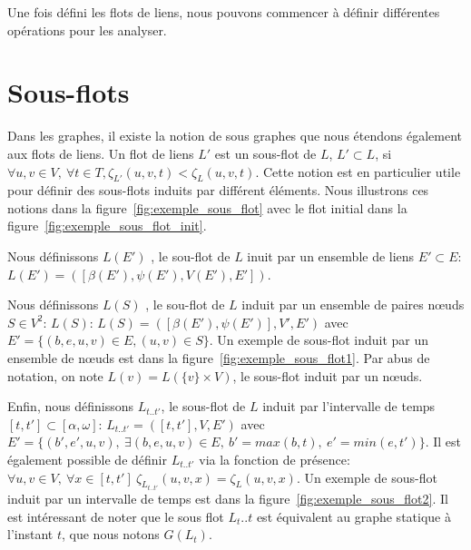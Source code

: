 Une fois défini les flots de liens, nous pouvons commencer à définir différentes opérations pour les analyser.


\section{Sous-flots}
Dans les graphes, il existe la notion de sous graphes que nous étendons également aux flots de liens.
Un flot de liens $L'$ est un sous-flot de $L$, $L' \subset L$, si  $\forall u,v \in V,\ \forall t\in T, \zeta_{L'}(u,v,t) < \zeta_{L}(u,v,t)$.
Cette notion est en particulier utile pour définir des sous-flots induits par différent éléments.
Nous illustrons ces notions dans la figure~\ref{fig:exemple_sous_flot} avec le flot initial dans la figure~\ref{fig:exemple_sous_flot_init}.
 
Nous définissons $L(E')$ , le sou-flot de $L$ inuit par un ensemble de liens $E' \subset E$: $L(E')=([\beta(E'),\psi(E'),V(E'),E'])$.

 
Nous définissons $L(S)$ , le sou-flot de $L$ induit par un ensemble de paires n\oe uds $S \in V^ 2$: $L(S)$: $L(S)=([\beta(E'),\psi(E')],V',E')$ avec $E'= \{(b,e,u,v) \in E, (u,v) \in S\}$.
Un exemple de sous-flot induit par un ensemble de n\oe uds est dans la figure~\ref{fig:exemple_sous_flot1}.
Par abus de notation, on note $L(v)= L(\{v\}\times V)$, le sous-flot induit par un n\oe uds.


Enfin, nous définissons $L_{t..t'}$, le sous-flot de $L$ induit par l'intervalle de temps $[t,t'] \subset [\alpha, \omega]$: $L_{t..t'}=([t, t'], V,E')$ avec $E'= \{(b',e',u,v),\ \exists (b,e,u,v) \in E,\ b'= max(b,t),\ e'=min(e,t')\}$.
Il est également possible de définir $L_{t..t'}$ via la fonction de présence: $\forall u,v \in V,\ \forall x \in [t,t']\  \zeta_{L_{t..t'}}(u,v,x) = \zeta_{L}(u,v,x)$.
Un exemple de sous-flot induit par un intervalle de temps est dans la figure~\ref{fig:exemple_sous_flot2}.
Il est intéressant de noter que le sous flot $L_t..t$ est équivalent au graphe statique à l'instant $t$,  que nous notons $G(L_t)$.


